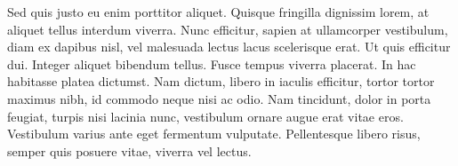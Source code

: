 Sed quis justo eu enim porttitor aliquet. Quisque fringilla dignissim lorem, at aliquet tellus interdum viverra. Nunc efficitur, sapien at ullamcorper vestibulum, diam ex dapibus nisl, vel malesuada lectus lacus scelerisque erat. Ut quis efficitur dui. Integer aliquet bibendum tellus. Fusce tempus viverra placerat. In hac habitasse platea dictumst. Nam dictum, libero in iaculis efficitur, tortor tortor maximus nibh, id commodo neque nisi ac odio. Nam tincidunt, dolor in porta feugiat, turpis nisi lacinia nunc, vestibulum ornare augue erat vitae eros. Vestibulum varius ante eget fermentum vulputate. Pellentesque libero risus, semper quis posuere vitae, viverra vel lectus.